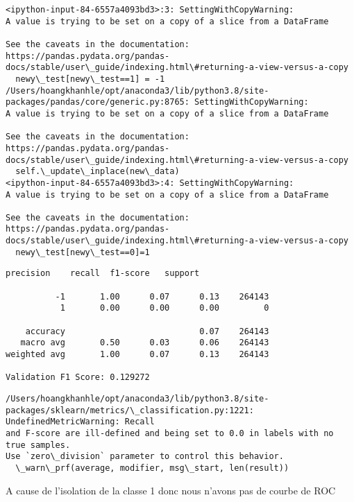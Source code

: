 \documentclass[11pt]{article}
\begin{document}
    \begin{Verbatim}[commandchars=\\\{\}]
<ipython-input-84-6557a4093bd3>:3: SettingWithCopyWarning:
A value is trying to be set on a copy of a slice from a DataFrame

See the caveats in the documentation: https://pandas.pydata.org/pandas-
docs/stable/user\_guide/indexing.html\#returning-a-view-versus-a-copy
  newy\_test[newy\_test==1] = -1
/Users/hoangkhanhle/opt/anaconda3/lib/python3.8/site-
packages/pandas/core/generic.py:8765: SettingWithCopyWarning:
A value is trying to be set on a copy of a slice from a DataFrame

See the caveats in the documentation: https://pandas.pydata.org/pandas-
docs/stable/user\_guide/indexing.html\#returning-a-view-versus-a-copy
  self.\_update\_inplace(new\_data)
<ipython-input-84-6557a4093bd3>:4: SettingWithCopyWarning:
A value is trying to be set on a copy of a slice from a DataFrame

See the caveats in the documentation: https://pandas.pydata.org/pandas-
docs/stable/user\_guide/indexing.html\#returning-a-view-versus-a-copy
  newy\_test[newy\_test==0]=1
    \end{Verbatim}

    \begin{Verbatim}[commandchars=\\\{\}]
              precision    recall  f1-score   support

          -1       1.00      0.07      0.13    264143
           1       0.00      0.00      0.00         0

    accuracy                           0.07    264143
   macro avg       0.50      0.03      0.06    264143
weighted avg       1.00      0.07      0.13    264143

Validation F1 Score: 0.129272
    \end{Verbatim}

    \begin{Verbatim}[commandchars=\\\{\}]
/Users/hoangkhanhle/opt/anaconda3/lib/python3.8/site-
packages/sklearn/metrics/\_classification.py:1221: UndefinedMetricWarning: Recall
and F-score are ill-defined and being set to 0.0 in labels with no true samples.
Use `zero\_division` parameter to control this behavior.
  \_warn\_prf(average, modifier, msg\_start, len(result))
    \end{Verbatim}

    A cause de l'isolation de la classe 1 donc nous n'avons pas de courbe de
ROC
\end{document}
